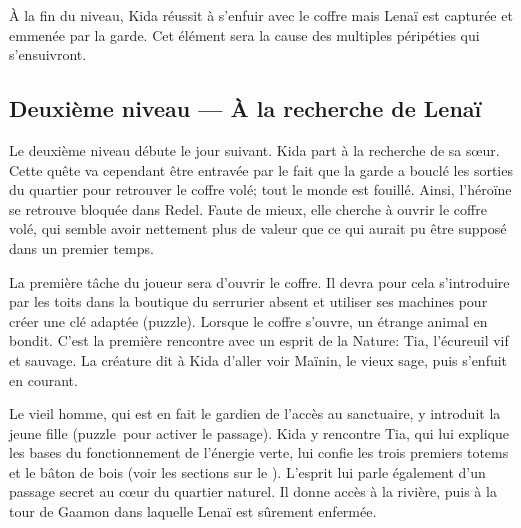 À la fin du niveau, Kida réussit à s'enfuir avec le coffre mais Lenaï est capturée et emmenée par la garde. Cet élément sera la cause des multiples péripéties qui s'ensuivront.


\subsection[Niveau 2 --- À la recherche de Lenaï]{Deuxième niveau --- À la recherche de Lenaï}
\label{sec:rechercheLenai}

Le deuxième niveau débute le jour suivant. Kida part à la recherche de sa s\oe ur. Cette quête va cependant être entravée par le fait que la garde a bouclé les sorties du quartier pour retrouver le coffre volé; tout le monde est fouillé. Ainsi, l'héroïne se retrouve bloquée dans Redel. Faute de mieux, elle cherche à ouvrir le coffre volé, qui semble avoir nettement plus de valeur que ce qui aurait pu être supposé dans un premier temps.

La première tâche du joueur sera d'ouvrir le coffre. Il devra pour cela s'introduire par les toits dans la boutique du serrurier absent et utiliser ses machines pour créer une clé adaptée (puzzle). Lorsque le coffre s'ouvre, un étrange animal en bondit. C'est la première rencontre avec un esprit de la Nature: Tia, l'écureuil vif et sauvage. La créature dit à Kida d'aller voir Maïnin, le vieux sage, puis s'enfuit en courant.

Le vieil homme, qui est en fait le gardien de l'accès au sanctuaire, y introduit la jeune fille (puzzle\ pour activer le passage). Kida y rencontre Tia, qui lui explique les bases du fonctionnement de l'énergie verte, lui confie les trois premiers totems et le bâton de bois (voir les sections sur le ). L'esprit lui parle également d'un passage secret au c\oe ur du quartier naturel. Il donne accès à la rivière, puis à la tour de Gaamon dans laquelle Lenaï est sûrement enfermée.

